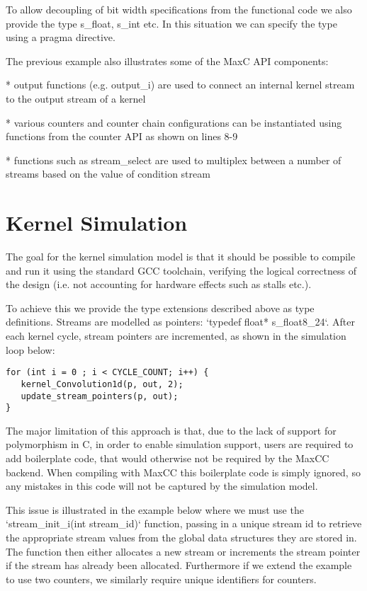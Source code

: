 \documentclass[conference]{IEEEtran}
\begin{document}
To allow decoupling of bit width specifications from the functional
code we also provide the type s\_float, s\_int etc. In this
situation we can specify the type using a pragma directive.

The previous example also illustrates some of the MaxC API components:

 * output functions (e.g. output\_i) are used to connect an internal
   kernel stream to the output stream of a kernel

 * various counters and counter chain configurations can be
   instantiated using functions from the counter API as shown on lines
   8-9

 * functions such as stream\_select are used to multiplex between a
   number of streams based on the value of condition stream

\section{Kernel Simulation}

The goal for the kernel simulation model is that it should be possible
to compile and run it using the standard GCC toolchain, verifying the
logical correctness of the design (i.e. not accounting for hardware
effects such as stalls etc.).

To achieve this we provide the type extensions described above as type
definitions. Streams are modelled as pointers: `typedef float*
s\_float8\_24`. After each kernel cycle, stream pointers are
incremented, as shown in the simulation loop below:

\lstset{style=MaxC}

\begin{lstlisting}
for (int i = 0 ; i < CYCLE_COUNT; i++) {
   kernel_Convolution1d(p, out, 2);
   update_stream_pointers(p, out);
}
\end{lstlisting}

The major limitation of this approach is that, due to the lack of
support for polymorphism in C, in order to enable simulation support,
users are required to add boilerplate code, that would otherwise not
be required by the MaxCC backend. When compiling with MaxCC this
boilerplate code is simply ignored, so any mistakes in this code will
not be captured by the simulation model.

This issue is illustrated in the example below where we must use the
`stream\_init\_i(int stream\_id)` function, passing in a unique stream id
to retrieve the appropriate stream values from the global data
structures they are stored in. The function then either allocates a
new stream or increments the stream pointer if the stream has already
been allocated. Furthermore if we extend the example to use two
counters, we similarly require unique identifiers for counters.
\end{document}
